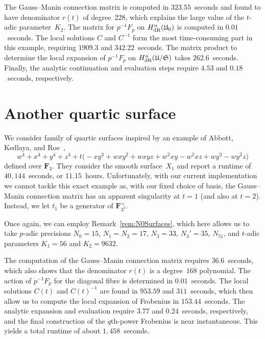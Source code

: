 The Gauss--Manin connection matrix is computed in $323.55$~seconds and found 
to have denominator $r(t)$ of degree~$228$, which explains the large value 
of the $t$-adic parameter~$K_2$.  The matrix for $p^{-1} F_p$ on 
$H_{\text{dR}}^{n}(\mathfrak{U}_0)$ is computed in $0.01$~seconds.  The local 
solutions $C$ and $C^{-1}$ form the most time-consuming part in this example, 
requiring $1909.3$ and $342.22$~seconds.  The matrix product to determine the 
local expansion of $p^{-1} F_p$ on $H_{\text{dR}}^{n}(\mathfrak{U}/\mathfrak{S})$ 
takes $262.6$~seconds. Finally, the analytic continuation and evaluation steps 
require $4.53$ and $0.18$~seconds, respectively.

\section{Another quartic surface}

We consider family of quartic surfaces inspired by an example of 
Abbott, Kedlaya, and Roe~\citep[Example~4.2.1]{AbbottKedlayaRoe2006}, 
\begin{equation*}
w^4 + x^4 + y^4 + z^4 + t \bigl(
    -x y^3 + w x y^2 + w x y z  + w^2 x y - w^2 x z + w y^3 - w y^2 z \bigr) 
\end{equation*}
defined over $\mathbf{F}_3$.  They consider the smooth surface~$X_1$ 
and report a runtime of $40,144$~seconds, or $11.15$~hours.  Unfortunately, 
with our current implementation we cannot tackle this exact example 
as, with our fixed choice of basis, the Gauss--Manin connection matrix 
has an apparent singularity at $t = 1$ (and also at $t = 2$).  Instead, 
we let $t_1$ be a generator of $\mathbf{F}_{3^2}^{\times}$.

Once again, we can employ Remark~\ref{rem:N0Surfaces}, which here allows 
us to take $p$-adic precisions $N_0 = 15$, $N_1 = N_2 = 17$, $N_3 = 33$, 
$N_3' = 35$, $N_51$, and $t$-adic parameters $K_1 = 56$ and $K_2 = 9632$.

The computation of the Gauss--Manin connection matrix requires $36.6$~seconds, 
which also shows that the denominator $r(t)$ is a degree~$168$ polynomial.
The action of $p^{-1} F_p$ for the diagonal fibre is determined in 
$0.01$~seconds.  The local solutions $C(t)$ and $C(t)^{-1}$ are found in 
$953.59$ and $311$~seconds, which then allow us to compute the local expansion 
of Frobenius in $153.44$~seconds.  The analytic expansion and 
evaluation require $3.77$ and $0.24$~seconds, respectively, and the final 
construction of the $q$th-power Frobenius is near instantaneous. 
This yields a total runtime of about $1,458$~seconds.

